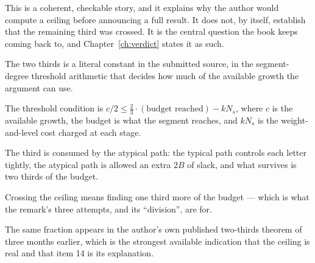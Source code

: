 This is a coherent, checkable story, and it explains why the author would
compute a ceiling before announcing a full result. It does not, by itself,
establish that the remaining third was crossed. It is the central question the
book keeps coming back to, and Chapter~\ref{ch:verdict} states it as such.

\begin{keytakeaways}
\item The two thirds is a literal constant in the submitted source, in the
segment-degree threshold arithmetic that decides how much of the available
growth the argument can use.
\item The threshold condition is $c/2 \le \tfrac23\cdot(\text{budget reached})
- kN_s$, where $c$ is the available growth, the budget is what the segment
reaches, and $kN_s$ is the weight-and-level cost charged at each stage.
\item The third is consumed by the atypical path: the typical path controls
each letter tightly, the atypical path is allowed an extra $2B$ of slack, and
what survives is two thirds of the budget.
\item Crossing the ceiling means finding one third more of the budget --- which
is what the remark's three attempts, and its ``division'', are for.
\item The same fraction appears in the author's own published two-thirds
theorem of three months earlier, which is the strongest available indication
that the ceiling is real and that item 14 is its explanation.
\end{keytakeaways}
